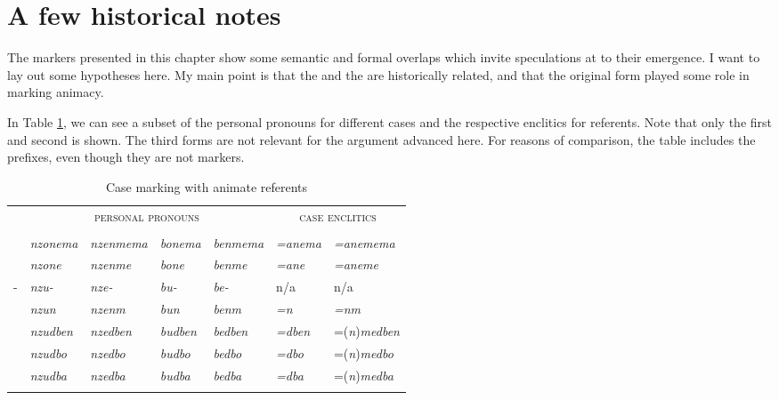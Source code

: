 \section{A few historical notes}\label{casenotes}

The  markers presented in this chapter show some semantic and formal overlaps which invite speculations at to their emergence. I want to lay out some hypotheses here. My main point is that the  and the  are historically related, and that the original form played some role in marking animacy.%

In Table \ref{casediscussionss}, we can see a subset of the personal pronouns for different cases and the respective  enclitics for  referents. Note that only the first and second  is shown. The third  forms are not relevant for the argument advanced here. For reasons of comparison, the table includes the  prefixes, even though they are not  markers.

\begin{table}[H]
\begin{center}
\caption{Case marking with animate referents} 
\label{casediscussionss} 
	\begin{tabularx}{\textwidth}{Xllllll}	
		\lsptoprule
		&\multicolumn{4}{c}{\textsc{personal pronouns}}&\multicolumn{2}{c}{\textsc{case enclitics}}\\
		&\Fsg{}&\Fnsg{}&\Ssg{}&\Snsg{}&\Sg{}&\Nsg{}\\ \midrule
		\Char{}&\emph{nzonema}&\emph{nzenmema}&\emph{bonema}&\emph{benmema}&\emph{=anema}&\emph{=anemema}\\
		\Poss{}&\emph{nzone}&\emph{nzenme}&\emph{bone}&\emph{benme}&\emph{=ane}&\emph{=aneme}\\ 
		\Poss-&\emph{nzu-}&\emph{nze-}&\emph{bu-}&\emph{be-}&n/a&n/a\\ 
		\Dat{}&\emph{nzun}&\emph{nzenm}&\emph{bun}&\emph{benm}&\emph{=n}&\emph{=nm}\\ 
		\Loc{}&\emph{nzudben}&\emph{nzedben}&\emph{budben}&\emph{bedben}&\emph{=dben}&=(\emph{n})\emph{medben}\\ 
		\All{}&\emph{nzudbo}&\emph{nzedbo}&\emph{budbo}&\emph{bedbo}&\emph{=dbo}&=(\emph{n})\emph{medbo}\\ 
		\Abl{}&\emph{nzudba}&\emph{nzedba}&\emph{budba}&\emph{bedba}&\emph{=dba}&=(\emph{n})\emph{medba}\\ 
		\lspbottomrule
	\end{tabularx}
\end{center}
\end{table}%

